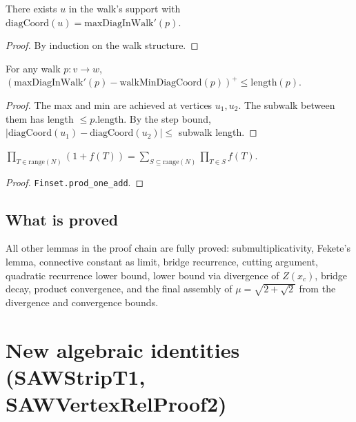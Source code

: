 \begin{lemma}
\begin{lemma}\label{lem:max_diag_achieved}
\leanok
{}
  There exists $u$ in the walk's support with $\mathrm{diagCoord}(u) =
  \mathrm{maxDiagInWalk'}(p)$.
\end{lemma}
\begin{proof}\leanok
  By induction on the walk structure.
\end{proof}

\begin{lemma}\label{lem:walk_width_max_min}
\leanok
{}
  For any walk $p: v \to w$,
  $(\mathrm{maxDiagInWalk'}(p) - \mathrm{walkMinDiagCoord}(p))^+ \leq
  \mathrm{length}(p)$.
\end{lemma}
\begin{proof}\leanok
  The max and min are achieved at vertices $u_1, u_2$. The subwalk
  between them has length $\leq p.\mathrm{length}$. By the step bound,
  $|\mathrm{diagCoord}(u_1) - \mathrm{diagCoord}(u_2)| \leq$
  subwalk length.
\end{proof}

\begin{lemma}\label{lem:prod_powerset}
\leanok
  $\prod_{T \in \mathrm{range}(N)} (1 + f(T)) = \sum_{S \subseteq
  \mathrm{range}(N)} \prod_{T \in S} f(T)$.
\end{lemma}
\begin{proof}\leanok
  \texttt{Finset.prod\_one\_add}.
\end{proof}

\subsection*{What is proved}

All other lemmas in the proof chain are fully proved:
submultiplicativity, Fekete's lemma, connective constant as limit,
bridge recurrence, cutting argument, quadratic recurrence lower bound,
lower bound via divergence of $Z(x_c)$, bridge decay, product
convergence, and the final assembly of $\mu = \sqrt{2+\sqrt{2}}$
from the divergence and convergence bounds.

\section{New algebraic identities (SAWStripT1, SAWVertexRelProof2)}


\end{lemma}
